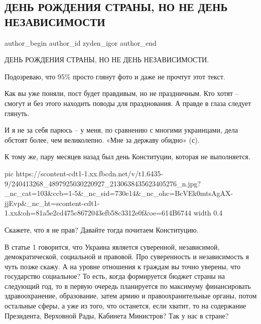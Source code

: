 
 
 
 
 
 
\subsection{ДЕНЬ РОЖДЕНИЯ СТРАНЫ, НО НЕ ДЕНЬ НЕЗАВИСИМОСТИ}
\label{sec:24_08_2021.fb.zyden_igor.1.strana_birthday_independence}
 
\ifcmt
 author_begin
   author_id zyden_igor
 author_end
\fi

ДЕНЬ РОЖДЕНИЯ СТРАНЫ, НО НЕ ДЕНЬ НЕЗАВИСИМОСТИ.

Подозреваю, что 95\% просто глянут фото и даже не прочтут этот текст.

Как вы уже поняли, пост будет правдивым, но не праздничным. Кто хотят – смогут
и без этого находить поводы для празднования. А правде в глаза следует глянуть.

И я не за себя парюсь – у меня, по сравнению с многими украинцами, дела обстоят
более, чем великолепно. «Мне за державу обидно» (с).

К тому же, пару месяцев назад был день Конституции, которая не выполняется.

\ifcmt
  pic https://scontent-cdt1-1.xx.fbcdn.net/v/t1.6435-9/240413268_4897925030220927_2130638435623405276_n.jpg?_nc_cat=103&ccb=1-5&_nc_sid=730e14&_nc_ohc=BcVEk0mtsAgAX-jjEvp&_nc_ht=scontent-cdt1-1.xx&oh=81a5e2cd475c8672043efb58c3312e0f&oe=614B6744
  width 0.4
\fi

Скажете, что я не прав? Давайте тогда почитаем Конституцию.

В статье 1 говорится, что Украина является суверенной, независимой,
демократической, социальной и правовой. Про суверенность и независимость я чуть
позже скажу. А на уровне отношения к граждам вы точно уверены, что государство
социальное? То есть, когда формируется бюджет страны на следующий год, то в
первую очередь планируется по максимуму финансировать здравоохранение,
образование, затем армию и правоохранительные органы, потом остальные сферы, а
уже из того, что останется, если хватит, то на содержание Президента, Верховной
Рады, Кабинета Министров? Так у нас в стране?


